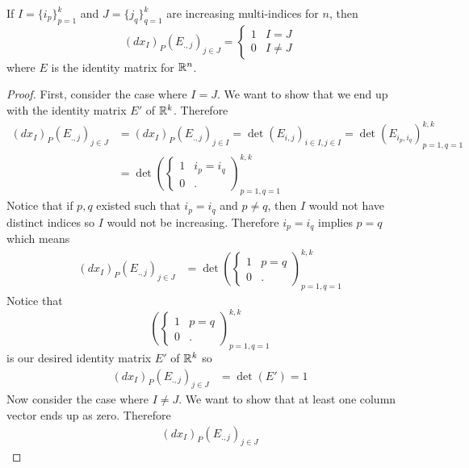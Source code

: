 \documentclass[notes]{subfiles}
\begin{document}
\begin{theorem} \label{nonzero_thm}
    If $I = \{i_p\}_{p = 1}^k$ and $J = \{j_q\}_{q = 1}^k$ are increasing multi-indices for $n$, then
    \[
        (dx_I)_P(E_{., j})_{j \in J} = \begin{cases}
            1 & I = J \\
            0 & I \neq J
        \end{cases}
    \]
    where $E$ is the identity matrix for $\mathbb{R}^n$.
\end{theorem}
\begin{proof}
    First, consider the case where $I = J$. We want to show that we end up with the identity matrix $E'$ of $\mathbb{R}^k$. Therefore
    \begin{align*}
        (dx_I)_P(E_{., j})_{j \in J}
        &= (dx_I)_P(E_{., j})_{j \in I}
        = \det(E_{i, j})_{i \in I, j \in I}
        = \det(E_{i_p, i_q})_{p = 1, q = 1}^{k, k} \\
        &= \det\left(\begin{cases}
            1 & i_p = i_q \\
            0 & .
        \end{cases}\right)_{p = 1, q = 1}^{k, k}
    \end{align*}
    Notice that if $p, q$ existed such that $i_p = i_q$ and $p \neq q$, then $I$ would not have distinct indices so $I$ would not be increasing. Therefore $i_p = i_q$ implies $p = q$ which means
    \begin{align*}
        (dx_I)_P(E_{., j})_{j \in J}
        &= \det\left(\begin{cases}
            1 & p = q \\
            0 & .
        \end{cases}\right)_{p = 1, q = 1}^{k, k}
    \end{align*}
    Notice that \[
        \left(\begin{cases}
            1 & p = q \\
            0 & .
        \end{cases}\right)_{p = 1, q = 1}^{k, k}
    \]
    is our desired identity matrix $E'$ of $\mathbb{R}^k$ so
    \begin{align*}
        (dx_I)_P(E_{., j})_{j \in J}
        &= \det(E')
        = 1
    \end{align*}
    Now consider the case where $I \neq J$. We want to show that at least one column vector ends up as zero. Therefore
    \begin{align*}
        (dx_I)_P(E_{., j})_{j \in J}

\end{align*}
\end{proof}
\end{document}
